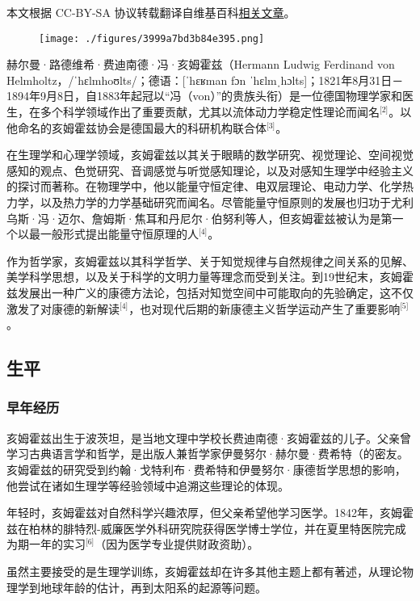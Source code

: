 
本文根据 CC-BY-SA 协议转载翻译自维基百科\href{https://en.wikipedia.org/wiki/Hermann_von_Helmholtz}{相关文章}。

\begin{figure}[ht]
\centering
\texttt{[image: ./figures/3999a7bd3b84e395.png]}
\caption{} \label{fig_HEMfhm_3}
\end{figure}
赫尔曼·路德维希·费迪南德·冯·亥姆霍兹（Hermann Ludwig Ferdinand von Helmholtz，/ˈhɛlmhoʊlts/；德语：[ˈhɛʁman fɔn ˈhɛlmˌhɔlts]；1821年8月31日－1894年9月8日，自1883年起冠以“冯（von）”的贵族头衔）是一位德国物理学家和医生，在多个科学领域作出了重要贡献，尤其以流体动力学稳定性理论而闻名\(^\text{[2]}\)。以他命名的亥姆霍兹协会是德国最大的科研机构联合体\(^\text{[3]}\)。

在生理学和心理学领域，亥姆霍兹以其关于眼睛的数学研究、视觉理论、空间视觉感知的观点、色觉研究、音调感觉与听觉感知理论，以及对感知生理学中经验主义的探讨而著称。在物理学中，他以能量守恒定律、电双层理论、电动力学、化学热力学，以及热力学的力学基础研究而闻名。尽管能量守恒原则的发展也归功于尤利乌斯·冯·迈尔、詹姆斯·焦耳和丹尼尔·伯努利等人，但亥姆霍兹被认为是第一个以最一般形式提出能量守恒原理的人\(^\text{[4]}\)。

作为哲学家，亥姆霍兹以其科学哲学、关于知觉规律与自然规律之间关系的见解、美学科学思想，以及关于科学的文明力量等理念而受到关注。到19世纪末，亥姆霍兹发展出一种广义的康德方法论，包括对知觉空间中可能取向的先验确定，这不仅激发了对康德的新解读\(^\text{[4]}\)，也对现代后期的新康德主义哲学运动产生了重要影响\(^\text{[5]}\)。
\subsection{生平}
\subsubsection{早年经历}
亥姆霍兹出生于波茨坦，是当地文理中学校长费迪南德·亥姆霍兹的儿子。父亲曾学习古典语言学和哲学，是出版人兼哲学家伊曼努尔·赫尔曼·费希特（的密友。亥姆霍兹的研究受到约翰·戈特利布·费希特和伊曼努尔·康德哲学思想的影响，他尝试在诸如生理学等经验领域中追溯这些理论的体现。

年轻时，亥姆霍兹对自然科学兴趣浓厚，但父亲希望他学习医学。1842年，亥姆霍兹在柏林的腓特烈-威廉医学外科研究院获得医学博士学位，并在夏里特医院完成为期一年的实习\(^\text{[6]}\)（因为医学专业提供财政资助）。

虽然主要接受的是生理学训练，亥姆霍兹却在许多其他主题上都有著述，从理论物理学到地球年龄的估计，再到太阳系的起源等问题。
